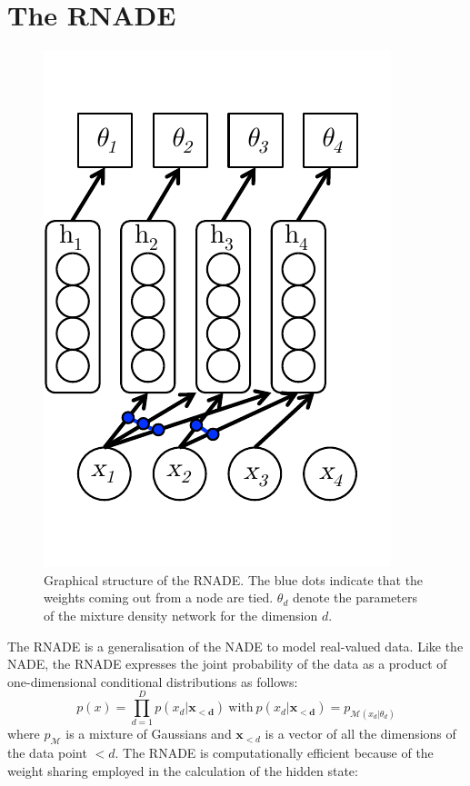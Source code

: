 \documentclass{article} %
\begin{document}
\section{The RNADE}
\label{RNADE}

\begin{figure}
	\centering
    \includegraphics[scale=0.7]{RNADE.pdf}
    \caption{Graphical structure of the RNADE. The blue dots indicate that the weights coming out from a node are tied. $\theta_{d}$ denote the parameters of the mixture density network for the dimension $d$. }
    \label{fig:rnn-rnade}
\end{figure}


The RNADE is a generalisation of the NADE to model real-valued data. Like the NADE, the RNADE expresses the joint probability of the data as a product of one-dimensional conditional distributions as follows:
$$ p(x) = \prod_{d=1}^{D} p(x_d|\mathbf{x_{<d}}) \: \text{with} \: p(x_d|\mathbf{x_{<d}}) = p_{\mathcal{M}(x_d|\theta_d)} $$ where $p_{\mathcal{M}}$ is a mixture of Gaussians and $\boldsymbol{x}_{<d}$ is a vector of all the dimensions of the data point $<d$. The RNADE is computationally efficient because of the weight sharing employed in the calculation of the hidden state: %
\end{document}

